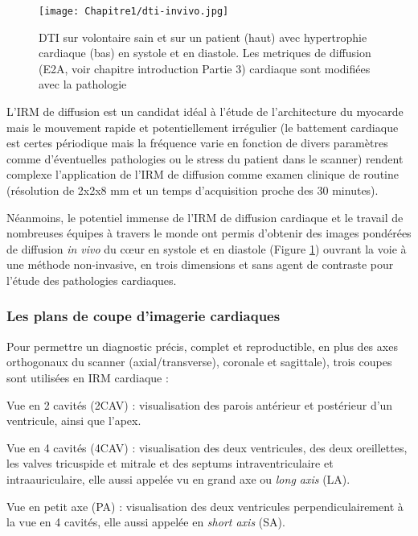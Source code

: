 \begin{figure}[!htbp]
  \begin{center}
    \texttt{[image: Chapitre1/dti-invivo.jpg]}
     \end{center}
    \caption{DTI sur volontaire sain et sur un patient (haut) avec hypertrophie cardiaque (bas) en systole et en diastole. Les metriques de diffusion (E2A, voir chapitre introduction Partie 3) cardiaque sont modifiées avec la pathologie}
  \label{fig:dti_inivo}
\end{figure}

L’IRM de diffusion est un candidat idéal à l’étude de l’architecture du myocarde mais le mouvement rapide et potentiellement irrégulier (le battement cardiaque est certes périodique mais la fréquence varie en fonction de divers paramètres comme d’éventuelles pathologies ou le stress du patient dans le scanner) rendent complexe l’application de l’IRM de diffusion comme examen clinique de routine (résolution de 2x2x8 mm et un temps d’acquisition proche des 30 minutes).

Néanmoins, le potentiel immense de l’IRM de diffusion cardiaque et le travail de nombreuses équipes à travers le monde ont permis d’obtenir des images pondérées de diffusion \textit{in vivo} du cœur en systole et en diastole (Figure \ref{fig:dti_inivo}) ouvrant la voie à une méthode non-invasive, en trois dimensions et sans agent de contraste pour l’étude des pathologies cardiaques.
\clearpage
\subsubsection{Les plans de coupe d’imagerie cardiaques}

 Pour permettre un diagnostic précis, complet et reproductible, en plus des axes orthogonaux du scanner (axial/transverse), coronale et sagittale), trois coupes sont utilisées en IRM cardiaque :
 \begin{bulletList}
\item Vue en 2 cavités (2CAV) : visualisation des parois antérieur et postérieur d’un ventricule, ainsi que l’apex.
 \item Vue en 4 cavités (4CAV) : visualisation des deux ventricules, des deux oreillettes, les valves tricuspide et mitrale et des septums intraventriculaire et intraauriculaire, elle aussi appelée vu en grand axe ou \textit{long axis} (LA).
 \item Vue en petit axe (PA) : visualisation des deux ventricules perpendiculairement à la vue en 4 cavités, elle aussi appelée en \textit{short axis} (SA).
\end{bulletList}

